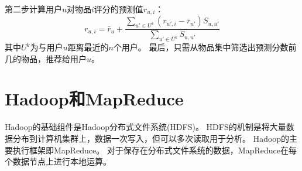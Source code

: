 第二步计算用户$u$对物品$i$评分的预测值$r_{u,i}$：
\begin{equation}
r_{u,i} = \bar{r}_u + \frac{\sum_{u'\in U^k}(r_{u',i}-\bar{r}_{u'})S_{u,u'}}{\sum_{u'\in U^k}S_{u,u'}}
\end{equation}
其中$U^k$为与用户$u$距离最近的$n$个用户。
最后，只需从物品集中筛选出预测分数前几的物品，推荐给用户$u$。

\section{Hadoop和MapReduce}
Hadoop的基础组件是Hadoop分布式文件系统(HDFS)。
HDFS的机制是将大量数据分布到计算机集群上，数据一次写入，但可以多次读取用于分析。
Hadoop的主要执行框架即MapReduce。
对于保存在分布式文件系统的数据，MapReduce在每个数据节点上进行本地运算。
\def\HDFSfront{
	\path (0,0) node(Splitn) [rectangle,draw] {Split(n)}
			(0,1) node {$\cdots$}
			(0,2) node(Split3) [rectangle,draw] {Split(3)}
			(0,3) node(Split2) [rectangle,draw] {Split(2)}
			(0,4) node(Split1) [rectangle,draw] {Split(1)}
			(0,5.5) node {\textbf{HDFS}};
	\draw (-1,-1) rectangle (1,6);
}
\def\HDFSend{
	\path (10,0) node(Partn) [rectangle,draw] {Part(n)}
			(10,1) node {$\cdots$}
			(10,2) node(Part3) [rectangle,draw] {Part(3)}
			(10,3) node(Part2) [rectangle,draw] {Part(2)}
			(10,4) node(Part1) [rectangle,draw] {Part(1)}
			(10,5.5) node {\textbf{HDFS}};
	\draw (9,-1) rectangle (11,6);
}
\def\mapper{
	\path (3.5,-1) node(Mapper4) [rectangle,draw] {\textbf{Mapper}}
			(3.5,0.5) node {$\cdots$}
			(3.5,2) node(Mapper3) [rectangle,draw] {\textbf{Mapper}}
			(3.5,3.5) node(Mapper2) [rectangle,draw] {\textbf{Mapper}}
			(3.5,5) node(Mapper1) [rectangle,draw] {\textbf{Mapper}};
}
\def\reducer{
	\path (7,1) node(Reducer2) [rectangle,draw] {\textbf{Reducer}}
			(7,2.5) node {$\cdots$}
			(7,4) node(Reducer1) [rectangle,draw] {\textbf{Reducer}};
}
\begin{center}
\label{fig:HadoopMapReduce}
\end{center}

